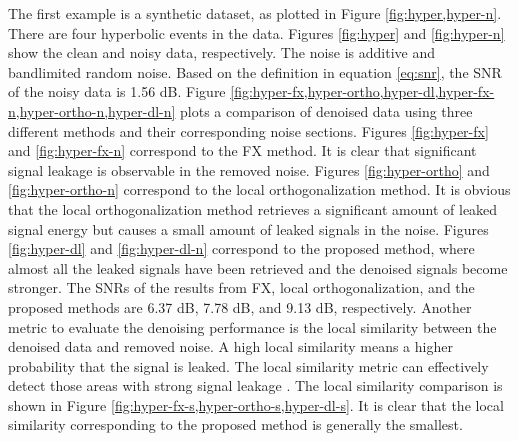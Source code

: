 The first example is a synthetic dataset, as plotted in Figure \ref{fig:hyper,hyper-n}. There are four hyperbolic events in the data. Figures  \ref{fig:hyper} and \ref{fig:hyper-n} show the clean and noisy data, respectively. The noise is additive and bandlimited random noise. Based on the definition in equation \ref{eq:snr}, the SNR of the noisy data is 1.56 dB. Figure \ref{fig:hyper-fx,hyper-ortho,hyper-dl,hyper-fx-n,hyper-ortho-n,hyper-dl-n} plots a comparison of denoised data using three different methods and their corresponding noise sections. Figures \ref{fig:hyper-fx} and \ref{fig:hyper-fx-n} correspond to the FX method. It is clear that significant signal leakage is observable in the removed noise. Figures \ref{fig:hyper-ortho} and \ref{fig:hyper-ortho-n} correspond to the local orthogonalization method. It is obvious that the local orthogonalization method retrieves a significant amount of leaked signal energy but causes a small amount of leaked signals in the noise. Figures \ref{fig:hyper-dl} and \ref{fig:hyper-dl-n} correspond to the proposed method, where almost all the leaked signals have been retrieved and the denoised signals become stronger.  The SNRs of the results from FX, local orthogonalization, and the proposed methods are 6.37 dB, 7.78 dB, and 9.13 dB, respectively. Another metric to evaluate the denoising performance is the local similarity between the denoised data and removed noise. A high local similarity means a higher probability that the signal is leaked. The local similarity metric can effectively detect those areas with strong signal leakage \cite[]{yangkang2015ortho}.  The local similarity comparison is shown in Figure \ref{fig:hyper-fx-s,hyper-ortho-s,hyper-dl-s}. It is clear that the local similarity corresponding to the proposed method is generally the smallest. 


